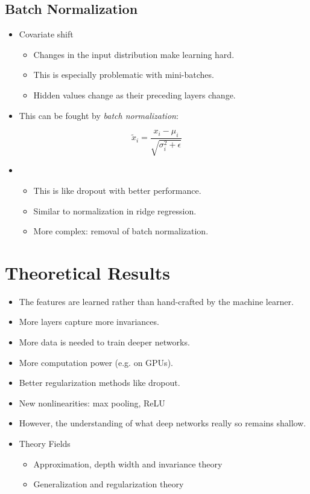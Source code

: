 \documentclass[a4paper, 11pt, accentcolor = tud3b]{tudreport}
\begin{document}
			\subsection{Batch Normalization}
				\begin{itemize}
					\item Covariate shift
						\begin{itemize}
							\item Changes in the input distribution make learning hard.
							\item This is especially problematic with mini-batches.
							\item Hidden values change as their preceding layers change.
						\end{itemize}
					\item This can be fought by \emph{batch normalization}:
				\end{itemize}
				\begin{equation}
					\tilde{x}_i = \frac{x_i - \mu_i}{\sqrt{\sigma_i^2 + \epsilon}}
				\end{equation}
				\begin{itemize}
					\item[]
						\begin{itemize}
							\item This is like dropout with better performance.
							\item Similar to normalization in ridge regression.
							\item More complex: removal of batch normalization.
						\end{itemize}
				\end{itemize}

		\section{Theoretical Results}
			\begin{itemize}
				\item The features are learned rather than hand-crafted by the machine learner.
				\item More layers capture more invariances.
				\item More data is needed to train deeper networks.
				\item More computation power (e.g. on GPUs).
				\item Better regularization methods like dropout.
				\item New nonlinearities: max pooling, ReLU
				\item However, the understanding of what deep networks really so remains shallow.
				\item Theory Fields
					\begin{itemize}
						\item Approximation, depth width and invariance theory
						\item Generalization and regularization theory
					\end{itemize}
			\end{itemize}
\end{document}
